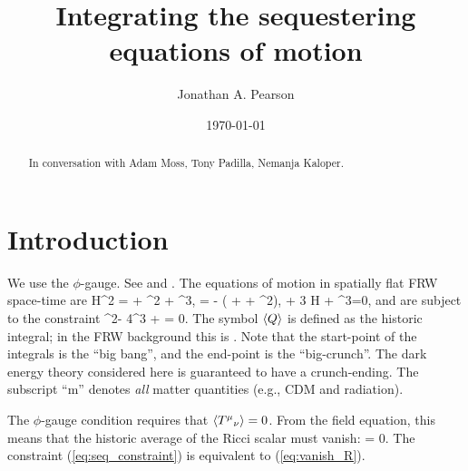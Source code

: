 \documentclass[amsmath,amssymb,12pt,eqsecnum]{revtex4}
\newcommand{\Mpsq}[0]{{\qsubrm{M}{pl}^2}}
\begin{document}
 

\title{Integrating the sequestering equations of motion}
\author{Jonathan A. Pearson}

\date{\today}


\begin{abstract} 
In conversation with Adam Moss, Tony Padilla, Nemanja Kaloper.

\end{abstract}

\maketitle
\section{Introduction}
We use the $\phi$-gauge. See \cite{Kaloper:2013zca, Kaloper:2014dqa, Kaloper:2014fca} and \cite{Avelino:2014nqa, Avelino:2014aea, Kluson:2014tma}.  The equations of motion in spatially flat FRW space-time are
\bse
\label{frw-eqnsofmotion}
\bea
3\Mpsq H^2 =  + \half \dot{\phi}^2 + ^3\phi,
\eea
\bea
3\Mpsq {} = - \left(  +  + \dot{\phi}^2\right),
\eea
\bea
\ddot{\phi} + 3 H \dot{\phi} + ^3=0,
\eea
\ese
and are subject to the constraint
\bea
\label{eq:seq_constraint}
\langle\dot{\phi}^2\rangle - 4^3 \expec{\phi} +  = 0.
\eea
The symbol $\left\langle Q\right\rangle$ is defined as the historic integral; in the FRW background this is
\bea
{}  {}.
\eea
Note that the start-point of the integrals is the ``big bang'', and the end-point is the ``big-crunch''. The dark energy theory considered here is guaranteed to have a crunch-ending.
The subscript ``m'' denotes {\it all} matter quantities (e.g., CDM and radiation).

The $\phi$-gauge condition requires that $\left\langle {T^{\mu}}_{\nu}\right\rangle=0$. From the field equation, this means that the historic average of the Ricci scalar must vanish:
\bea
\label{eq:vanish_R}
 = 0.
\eea
The constraint (\ref{eq:seq_constraint}) is equivalent to (\ref{eq:vanish_R}).
\end{document}
